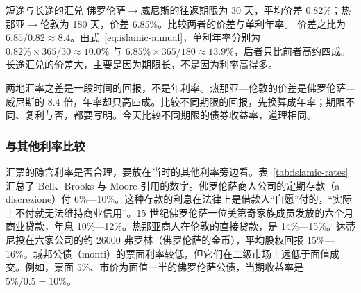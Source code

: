 \begin{example}{短途与长途的汇兑}\label{ex:islamic-term}
佛罗伦萨$\to$威尼斯的往返期限为 30 天，平均价差 0.82\%；热那亚$\to$伦敦为 180 天，价差 6.85\%。比较两者的价差与单利年率。
\solution 价差之比为 $6.85/0.82\approx8.4$。由式~\eqref{eq:islamic-annual}，单利年率分别为 $0.82\%\times365/30\approx10.0\%$ 与 $6.85\%\times365/180\approx13.9\%$，后者只比前者高约四成。长途汇兑的价差大，主要是因为期限长，不是因为利率高得多。
\end{example}

\begin{pitfall}
两地汇率之差是一段时间的回报，不是年利率。热那亚—伦敦的价差是佛罗伦萨—威尼斯的 8.4 倍，年率却只高四成。比较不同期限的回报，先换算成年率；期限不同、复利与否，都要写明。今天比较不同期限的债券收益率，道理相同。
\end{pitfall}

\subsubsection{与其他利率比较}
汇票的隐含利率是否合理，要放在当时的其他利率旁边看。表~\ref{tab:islamic-rates} 汇总了 Bell、Brooks 与 Moore 引用的数字。佛罗伦萨商人公司的定期存款（a discrezione）付 6\%—10\%。这种存款的利息在法律上是借款人“自愿”付的，“实际上不付就无法维持商业信用”\cite{bell2017}。15 世纪佛罗伦萨一位美第奇家族成员发放的六个月商业贷款，年息 10\%—12\%。热那亚商人在伦敦的直接贷款，是 14\%—15\%。达蒂尼投在六家公司的约 26000 弗罗林（佛罗伦萨的金币），平均股权回报 15\%—16\%。城邦公债（monti）的票面利率较低，但它们在二级市场上远低于面值成交。例如，票面 5\%、市价为面值一半的佛罗伦萨公债，当期收益率是 $5\%/0.5=10\%$。

